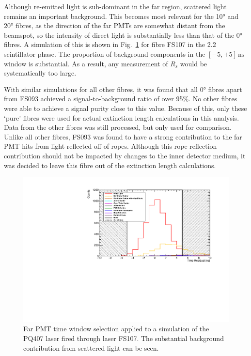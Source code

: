 Although re-emitted light is sub-dominant in the far region, scattered light remains an important background. This becomes most relevant for the \ang{10} and \ang{20} fibres, as the direction of the far PMTs are somewhat distant from the beamspot, so the intensity of direct light is substantially less than that of the \ang{0} fibres. A simulation of this is shown in Fig.~\ref{fig:smellie_PQ407_FS107_far_pmts_components} for fibre FS107 in the \SI{2.2}{\gpl} scintillator phase. The proportion of background components in the $[-5,+5]\,\si{\ns}$ window is substantial. As a result, any measurement of $R_{s}$ would be systematically too large. %

With similar simulations for all other fibres, it was found that all \ang{0} fibres apart from FS093 achieved a signal-to-background ratio of over 95\%. No other fibres were able to achieve a signal purity close to this value. Because of this, only these `pure' fibres were used for actual extinction length calculations in this analysis. Data from the other fibres was still processed, but only used for comparison. Unlike all other fibres, FS093 was found to have a strong contribution to the far PMT hits from light reflected off of ropes. Although this rope reflection contribution should not be impacted by changes to the inner detector medium, it was decided to leave this fibre out of the extinction length calculations.

\begin{figure}
    \centering
    \includegraphics[width=\textwidth]{5_SMELLIEAnalysis/images/far_pmts_tres_components_nice_PQ407_FS107.pdf}
    \caption[Far PMT time window selection applied to a simulation of the PQ407 laser fired through laser FS107]
    {Far PMT time window selection applied to a simulation of the PQ407 laser fired through laser FS107. The substantial background contribution from scattered light can be seen.}
    \label{fig:smellie_PQ407_FS107_far_pmts_components}
\end{figure}

